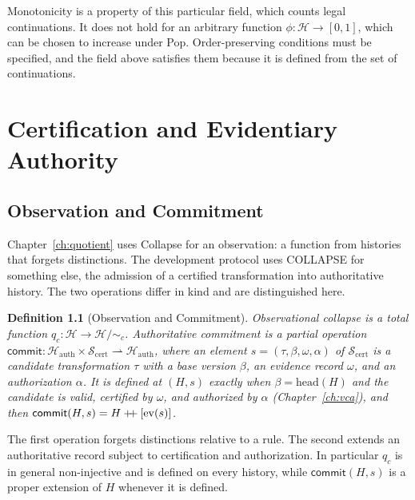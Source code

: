 \documentclass[12pt,oneside,openany]{book}
\theoremstyle{spherepop}
\newtheorem{definition}{Definition}[chapter]
\theoremstyle{remarkstyle}
\newcommand{\hconcat}{\mathbin{+\mkern-5mu+}}
\newcommand{\calH}{\mathcal{H}}
\begin{document}
Monotonicity is a property of this particular field, which counts legal continuations. It does not hold for an arbitrary function $\phi:\calH\to[0,1]$, which can be chosen to increase under Pop. Order-preserving conditions must be specified, and the field above satisfies them because it is defined from the set of continuations.

\part{Certification and Evidentiary Authority}
\label{part:cert}

\chapter{Observation and Commitment}
\label{ch:separation}

Chapter~\ref{ch:quotient} uses Collapse for an observation: a function from histories that forgets distinctions. The development protocol uses COLLAPSE for something else, the admission of a certified transformation into authoritative history. The two operations differ in kind and are distinguished here.

\begin{definition}[Observation and Commitment]
\label{def:commit}
\emph{Observational collapse} is a total function $q_c:\calH\to\calH/{\sim_c}$. \emph{Authoritative commitment} is a partial operation $\mathsf{commit}:\calH_{\mathrm{auth}}\times\mathcal S_{\mathrm{cert}}\rightharpoonup\calH_{\mathrm{auth}}$, where an element $s=(\tau,\beta,\omega,\alpha)$ of $\mathcal S_{\mathrm{cert}}$ is a candidate transformation $\tau$ with a base version $\beta$, an evidence record $\omega$, and an authorization $\alpha$. It is defined at $(H,s)$ exactly when $\beta=\mathrm{head}(H)$ and the candidate is valid, certified by $\omega$, and authorized by $\alpha$ (Chapter~\ref{ch:vca}), and then $\mathsf{commit}(H,s)=H\hconcat[\mathrm{ev}(s)]$.
\end{definition}

The first operation forgets distinctions relative to a rule. The second extends an authoritative record subject to certification and authorization. In particular $q_c$ is in general non-injective and is defined on every history, while $\mathsf{commit}(H,s)$ is a proper extension of $H$ whenever it is defined.
\end{document}
